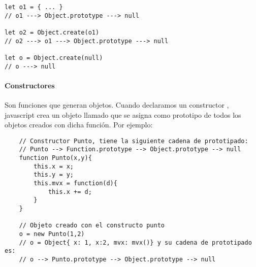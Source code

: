 \begin{centrado}
\begin{verbatim}
let o1 = { ... }
// o1 ---> Object.prototype ---> null

let o2 = Object.create(o1)
// o2 ---> o1 ---> Object.prototype ---> null

let o = Object.create(null)
// o ---> null
\end{verbatim}
\end{centrado}

\paragraph{Constructores} Son funciones que generan objetos. Cuando declaramos un constructor , javascript crea un objeto llamado  que se asigna como prototipo de todos los objetos creados con dicha función. Por ejemplo:

\begin{centrado}
\begin{verbatim}
    // Constructor Punto, tiene la siguiente cadena de prototipado:
    // Punto --> Function.prototype --> Object.prototype --> null
    function Punto(x,y){
        this.x = x;
        this.y = y;
        this.mvx = function(d){
            this.x += d;
        }
    }
    
    // Objeto creado con el constructo punto
    o = new Punto(1,2)
    // o = Object{ x: 1, x:2, mvx: mvx()} y su cadena de prototipado es:
    // o --> Punto.prototype --> Object.prototype --> null
\end{verbatim}
\end{centrado}
